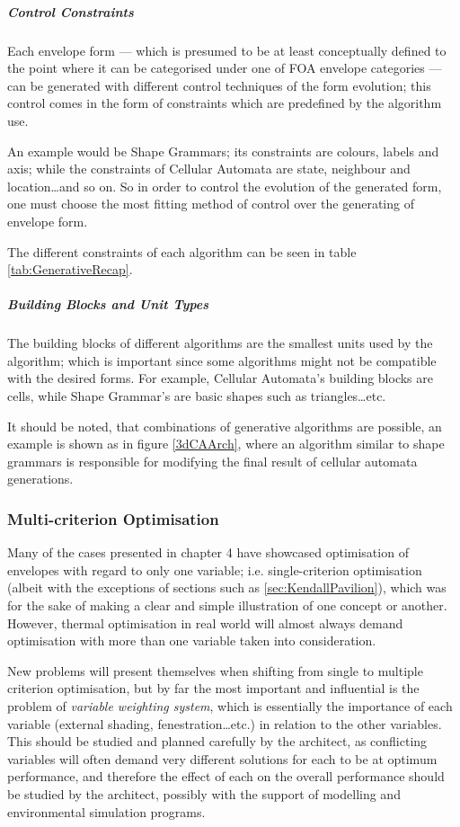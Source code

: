 \subparagraph{Control Constraints}

Each envelope form --- which is presumed to be at least conceptually defined to the point where it can be categorised under one of FOA envelope categories --- can be generated with different control techniques of the form evolution; this control comes in the form of constraints which are predefined by the algorithm use.

An example would be Shape Grammars; its constraints are colours, labels and axis; while the constraints of Cellular Automata are state, neighbour and location\ldots and so on. So in order to control the evolution of the generated form, one must choose the most fitting method of control over the generating of envelope form.

The different constraints of each algorithm can be seen in table \ref{tab:GenerativeRecap}.

\subparagraph{Building Blocks and Unit Types}

The building blocks of different algorithms are the smallest units used by the algorithm; which is important since some algorithms might not be compatible with the desired forms. For example, Cellular Automata's building blocks are cells, while Shape Grammar's are basic shapes such as triangles\ldots{}etc.

It should be noted, that combinations of generative algorithms are possible, an example is shown as in figure \ref{3dCAArch}, where an algorithm similar to shape grammars is responsible for modifying the final result of cellular automata generations.

\subsubsection{Multi-criterion Optimisation}

Many of the cases presented in chapter 4 have showcased optimisation of envelopes with regard to only one variable; i.e. single-criterion optimisation (albeit with the exceptions of sections such as \ref{sec:KendallPavilion}), which was for the sake of making a clear and simple illustration of one concept or another. However, thermal optimisation in real world will almost always demand optimisation with more than one variable taken into consideration.

New problems will present themselves when shifting from single to multiple criterion optimisation, but by far the most important and influential is the problem of \emph{variable weighting system}, which is essentially the importance of each variable (external shading, fenestration\ldots etc.) in relation to the other variables. This should be studied and planned carefully by the architect, as conflicting variables will often demand very different solutions for each to be at optimum performance, and therefore the effect of each on the overall performance should be studied by the architect, possibly with the support of modelling and environmental simulation programs.

